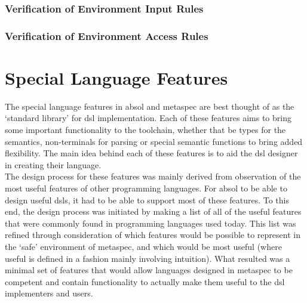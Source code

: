 
\subsubsection{Verification of Environment Input Rules} %
\label{ssub:verification_of_environment_input_rules}


\subsubsection{Verification of Environment Access Rules} %
\label{ssub:verification_of_environment_access_rules}




\section{Special Language Features} %
\label{sec:special_language_features}

The special language features in \gls{absol} and \gls{metaspec} are best thought of as the `standard library' for \gls{dsl} implementation.
Each of these features aims to bring some important functionality to the toolchain, whether that be types for the semantics, non-terminals for parsing or special semantic functions to bring added flexibility. 
The main idea behind each of these features is to aid the \gls{dsl} designer in creating their language. \\

The design process for these features was mainly derived from observation of the most useful features of other programming languages.
For \gls{absol} to be able to design useful \glspl{dsl}, it had to be able to support most of these features. 
To this end, the design process was initiated by making a list of all of the useful features that were commonly found in programming languages used today.
This list was refined through consideration of which features would be possible to represent in the `safe' environment of \gls{metaspec}, and which would be most useful (where useful is defined in a fashion mainly involving intuition).
What resulted was a minimal set of features that would allow languages designed in \gls{metaspec} to be competent and contain functionality to actually make them useful to the \gls{dsl} implementers and users. 

